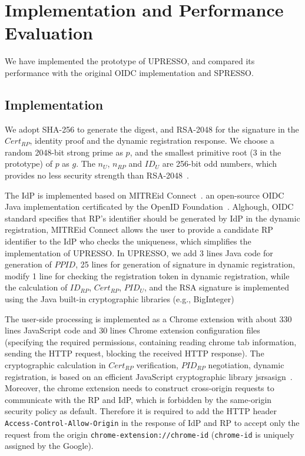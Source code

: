 \section{Implementation and Performance Evaluation}
\label{sec:implementation}
We have implemented the prototype of UPRESSO, and compared its performance with the original OIDC implementation and SPRESSO.

\subsection{Implementation}
We adopt SHA-256 to generate the digest, and  RSA-2048 for the signature in  the $Cert_{RP}$, identity proof and the dynamic registration response. We  choose a random 2048-bit strong prime as $p$, and the smallest primitive root (3 in the prototype)  of $p$ as $g$. The  $n_U$, $n_{RP}$ and $ID_U$  are 256-bit odd numbers, which provides no less security strength than RSA-2048~\cite{barkerecommendation}.

The IdP is implemented based on MITREid Connect~\cite{MITREid}. an open-source OIDC Java implementation certificated by the OpenID Foundation~\cite{OIDF}. Alghough, OIDC standard specifies that RP's identifier should be generated by IdP in the dynamic registration, MITREid Connect allows the user to provide a candidate RP identifier to the IdP who checks the uniqueness, which simplifies the implementation of UPRESSO. In UPRESSO, we add 3 lines Java code for generation of $PPID$, 25 lines for generation of signature in dynamic registration, modify 1 line for checking the registration token in dynamic registration, while the calculation of $ID_{RP}$, $Cert_{RP}$,  $PID_U$, and the RSA signature is implemented using the Java built-in cryptographic libraries (e.g., BigInteger)

The user-side processing is implemented as a Chrome extension with about 330 lines JavaScript code and 30 lines  Chrome extension configuration files (specifying the required permissions, containing reading chrome tab information, sending the HTTP request, blocking the received HTTP response). The cryptographic calculation in $Cert_{RP}$ verification, $PID_{RP}$ negotiation, dynamic registration, is based on an efficient JavaScript cryptographic library  jsrsasign~\cite{jsrsasign}. 
Moreover, the chrome extension needs to construct cross-origin requests to communicate with the RP and IdP, which is forbidden by the same-origin security policy as default. Therefore it is required to add the HTTP header \verb+Access-Control-Allow-Origin+ in the response of IdP and RP to accept only the request from the origin \verb+chrome-extension://chrome-id+ (\verb+chrome-id+ is uniquely assigned by the Google).


